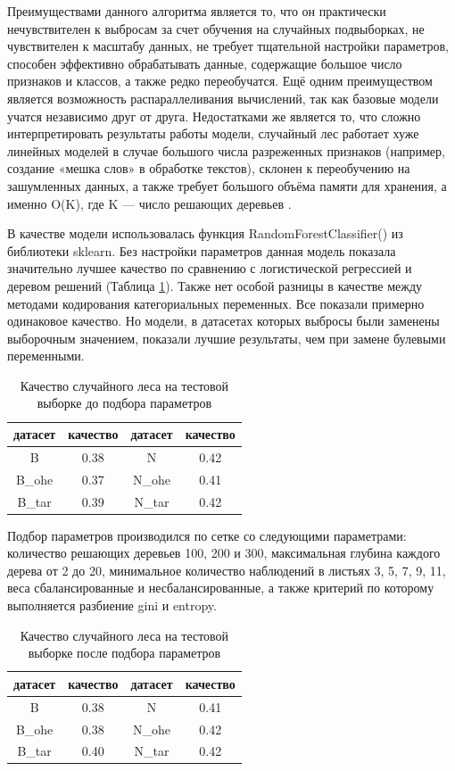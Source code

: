 \documentclass[14pt]{mmcs_article}
\begin{document}
Преимуществами данного алгоритма является то, что он практически нечувствителен к выбросам за счет обучения на случайных подвыборках, не чувствителен к масштабу данных, не требует тщательной настройки параметров, способен эффективно обрабатывать данные, содержащие большое число признаков и классов, а также редко переобучатся. Ещё одним преимуществом является возможность распараллеливания вычислений, так как базовые модели учатся независимо друг от друга. Недостатками же является то, что сложно интерпретировать результаты работы модели, случайный лес работает хуже линейных моделей в случае большого числа разреженных признаков (например, создание «мешка слов» в обработке текстов), склонен к переобучению на зашумленных данных, а также требует большого объёма памяти для хранения, а именно O(K), где K ---  число решающих деревьев \cite{lib:randomforest2}.

В качестве модели использовалась функция RandomForestClassifier() из библиотеки sklearn. Без настройки параметров данная модель показала значительно лучшее качество по сравнению с логистической регрессией и деревом решений (Таблица \ref{models:table5}). Также нет особой разницы в качестве между методами кодирования категориальных переменных. Все показали примерно одинаковое качество. Но модели, в датасетах которых выбросы были заменены выборочным значением, показали лучшие результаты, чем при замене булевыми переменными.

\begin{table}[H]
	\centering
	\caption{Качество случайного леса на тестовой выборке до подбора параметров}\label{models:table5}
	\begin{tabular}{cccc}
		\hline
		датасет & качество	& датасет & качество \\
		\hline
		B &	0.38 &	N &	0.42 \\
		B\_ohe & 0.37 &	N\_ohe & 0.41\\
		B\_tar & 0.39 & N\_tar & 0.42 \\
		\hline
	\end{tabular}
\end{table}

Подбор параметров производился по сетке со следующими параметрами: количество решающих деревьев 100, 200 и 300, максимальная глубина каждого дерева от 2 до 20, минимальное количество наблюдений в листьях 3, 5, 7, 9, 11, веса сбалансированные и несбалансированные, а также критерий по которому выполняется разбиение gini и entropy.

\begin{table}[H]
	\centering
	\caption{Качество случайного леса на тестовой выборке после подбора параметров}\label{models:table6}
	\begin{tabular}{cccc}
		\hline
		датасет & качество	& датасет & качество \\
		\hline
		B &	0.38 &	N &	0.41 \\
		B\_ohe & 0.38 &	N\_ohe & 0.42\\
		B\_tar & 0.40 & N\_tar & 0.42 \\
		\hline
	\end{tabular}
\end{table}
\end{document}
